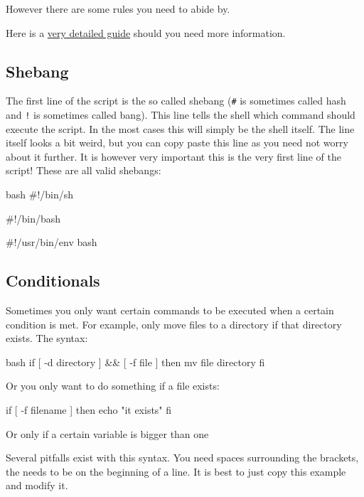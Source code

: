 However there are some rules you need to abide by.

Here is a \href{http://www.tldp.org/LDP/Bash-Beginners-Guide/html/}{very detailed guide} should you need more information.

\subsection{Shebang}
The first line of the script is the so called shebang (\verb|#| is sometimes called
hash and \verb|!| is sometimes called bang). This line tells the shell which
command should execute the script. In the most cases this will simply be the
shell itself. The line itself looks a bit weird, but you can copy paste this
line as you need not worry about it further. It is however very important this
is the very first line of the script! These are all valid shebangs:

\begin{code}{bash}
 #!/bin/sh

 #!/bin/bash

 #!/usr/bin/env bash
\end{code}

\subsection{Conditionals}

Sometimes you only want certain commands to be executed when a certain condition
is met. For example, only move files to a directory if that directory exists.
The syntax:

\begin{code}{bash}
 if [ -d directory ] && [ -f file ]
 then
    mv file directory
 fi

Or you only want to do something if  a file exists:

 if [ -f filename ]
 then
    echo "it exists"
 fi
\end{code}

Or only if a certain variable is bigger than one


Several pitfalls exist with this syntax. You need spaces surrounding the
brackets, the  needs to be on the beginning of a line. It is best
to just copy this example and modify it.

